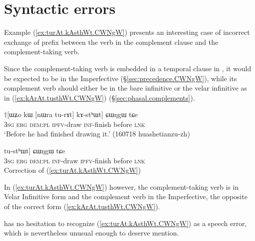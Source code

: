 \section{Syntactic errors} \label{sec:syntactic.errors}
 
Example (\ref{ex:turAt.kAsthWt.CWNgW}) presents an interesting case of incorrect exchange of prefix between the verb in the complement clause and the com\-ple\-ment-taking verb. 

Since the com\-ple\-ment-taking verb  is embedded in a temporal clause in , it would be expected to be in the Imperfective (§\ref{sec:precedence.CWNgW}), while its complement verb should either be in the bare infinitive or the velar infinitive as in (\ref{ex:kArAt.tusthWt.CWNgW}) (§\ref{sec:phasal.complements}).

\begin{exe}
\ex \label{ex:turAt.kAsthWt.CWNgW}
\gll $\dagger$[ɯʑo kɯ [nɯra tu-rɤt] kɤ-stʰɯt] ɕɯŋgɯ tɕe \\
\textsc{3sg} \textsc{erg} \textsc{dem}:\textsc{pl} \textsc{ipfv}-draw \textsc{inf}-finish before \textsc{lnk} \\
\glt `Before he had finished drawing it.' (160718 huashetianzu-zh)
\end{exe} 

\begin{exe}
\ex \label{ex:kArAt.tusthWt.CWNgW}
\gll [ɯʑo kɯ [nɯra kɤ-rɤt] tu-stʰɯt] ɕɯŋgɯ tɕe \\
\textsc{3sg} \textsc{erg} \textsc{dem}:\textsc{pl} \textsc{inf}-draw \textsc{ipfv}-finish before \textsc{lnk} \\
\glt Correction of (\ref{ex:turAt.kAsthWt.CWNgW})
\end{exe}   

In (\ref{ex:turAt.kAsthWt.CWNgW}) however, the com\-ple\-ment-taking verb is in Velar Infinitive form and the complement verb in the Imperfective, the opposite of the correct form (\ref{ex:kArAt.tusthWt.CWNgW}).

 has no hesitation to recognize (\ref{ex:turAt.kAsthWt.CWNgW}) as a speech error, which is nevertheless unusual enough to deserve mention.

